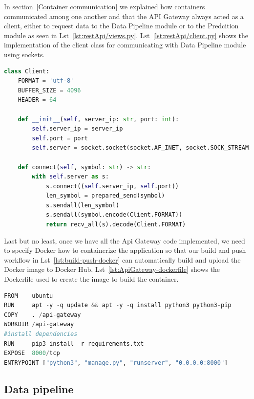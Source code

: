 In section~\ref{Container communication} we explained how containers communicated among one another and that the API Gateway always acted as a client, either to request data to the Data Pipeline module or to the Predcition module as seen in Lst~\ref{lst:restApi/views.py}. Lst~\ref{lst:restApi/client.py} shows the implementation of the client class for communicating with Data Pipeline module using sockets.

\begin{lstlisting}[language=python,caption=restApi/client.py,label={lst:restApi/client.py}]
class Client:
    FORMAT = 'utf-8'
    BUFFER_SIZE = 4096
    HEADER = 64

    def __init__(self, server_ip: str, port: int):
        self.server_ip = server_ip
        self.port = port
        self.server = socket.socket(socket.AF_INET, socket.SOCK_STREAM)

    def connect(self, symbol: str) -> str:
        with self.server as s:
            s.connect((self.server_ip, self.port))
            len_symbol = prepared_send(symbol)
            s.sendall(len_symbol)
            s.sendall(symbol.encode(Client.FORMAT))
            return recv_all(s).decode(Client.FORMAT)

\end{lstlisting}

Last but no least, once we have all the Api Gateway code implemented, we need to specify Docker how to containerize the application so that our build and push workflow in Lst~\ref{lst:build-push-docker} can automatically build and upload the Docker image to Docker Hub. Lst~\ref{lst:ApiGateway-dockerfile} shows the Dockerfile used to create the image to build the container. 


\begin{lstlisting}[language=python,caption=Api Gateway Dockerfile,label={lst:ApiGateway-dockerfile}]
FROM    ubuntu
RUN     apt -y -q update && apt -y -q install python3 python3-pip
COPY    . /api-gateway 
WORKDIR /api-gateway
#install dependencies
RUN     pip3 install -r requirements.txt 
EXPOSE  8000/tcp
ENTRYPOINT ["python3", "manage.py", "runserver", "0.0.0.0:8000"] 
\end{lstlisting}

\subsection{Data pipeline}

